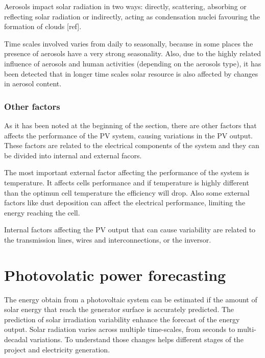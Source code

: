 Aerosols impact solar radiation in two ways: directly, scattering, absorbing or reflecting solar radiation or indirectly, acting as condensation nuclei favouring the formation of clouds [ref].

Time scales involved varies from daily to seasonally, because in some places the presence of aerosols have a very strong seasonality. Also, due to the highly related influence of aerosols and human activities (depending on the aerosols type), it has been detected that in longer time scales solar resource is also affected by changes in aerosol content.


\subsubsection{Other factors}

As it has been noted at the beginning of the section, there are other factors that affects the performance of the PV system, causing variations in the PV output. These factors are related to the electrical components of the system and they can be divided into internal and external facors.

The most important external factor affecting the performance of the system is temperature. It affects cells performance and if temperature is highly different than the optimun cell temperature the efficiency will drop. Also some external factors like dust deposition can affect the electrical performance, limiting the energy reaching the cell.

Internal factors affecting the PV output that can cause variability are related to the transmission lines, wires and interconnections, or the inversor.

\section{Photovolatic power forecasting}

The energy obtain from a photovoltaic system can be estimated if the amount of solar energy that reach the generator surface is accurately predicted. The prediction of solar irradiation variability enhance the forecast of the energy output. Solar radiation varies across multiple time-scales, from seconds to multi-decadal variations. To understand those changes helps different stages of the project and electricity generation.

